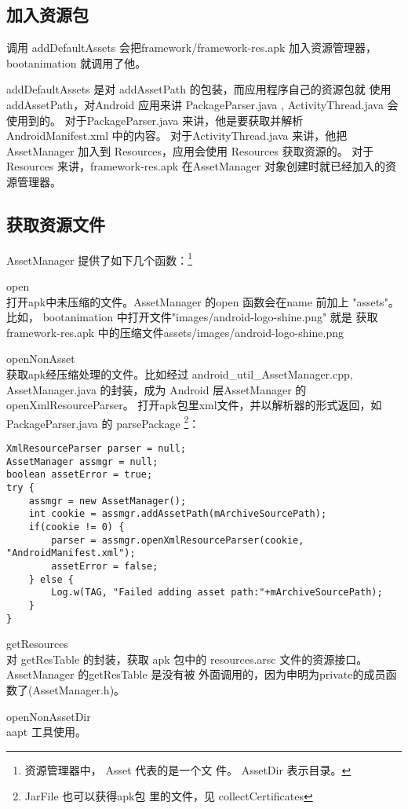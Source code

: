 \documentclass[a4paper,11pt]{article}
\begin{document}
\subsection{加入资源包}
调用 addDefaultAssets 会把framework/framework-res.apk 加入资源管理器，
bootanimation 就调用了他。

addDefaultAssets 是对 addAssetPath 的包装，而应用程序自己的资源包就 使用
addAssetPath，对Android 应用来讲 PackageParser.java , ActivityThread.java
会使用到的。
对于PackageParser.java 来讲，他是要获取并解析 AndroidManifest.xml 中的内容。
对于ActivityThread.java 来讲，他把 AssetManager 加入到 Resources，应用会使用
Resources 获取资源的。 对于 Resources 来讲，framework-res.apk 在AssetManager
对象创建时就已经加入的资源管理器。

\subsection{获取资源文件}
AssetManager 提供了如下几个函数：\footnote{资源管理器中， Asset 代表的是一个文
件。 AssetDir 表示目录。}
\begin{enumerate*}
    \item open\\ 打开apk中未压缩的文件。AssetManager 的open 函数会在name 前加上 "assets"。比如，
        bootanimation 中打开文件"images/android-logo-shine.png" 就是
        获取 framework-res.apk 中的压缩文件assets/images/android-logo-shine.png
    \item openNonAsset \\ 获取apk经压缩处理的文件。比如经过 android_util_AssetManager.cpp,
        AssetManager.java 的封装，成为 Android 层AssetManager 的
        openXmlResourceParser。 打开apk包里xml文件，并以解析器的形式返回，如
        PackageParser.java  的 parsePackage \footnote{JarFile 也可以获得apk包
        里的文件，见 collectCertificates}：
\begin{lstlisting}
XmlResourceParser parser = null;
AssetManager assmgr = null;
boolean assetError = true;
try {
    assmgr = new AssetManager();
    int cookie = assmgr.addAssetPath(mArchiveSourcePath);
    if(cookie != 0) {
        parser = assmgr.openXmlResourceParser(cookie, "AndroidManifest.xml");
        assetError = false;
    } else {
        Log.w(TAG, "Failed adding asset path:"+mArchiveSourcePath);
    }
}
\end{lstlisting}

    \item getResources \\ 对 getResTable 的封装，获取 apk 包中的
        resources.arsc 文件的资源接口。 AssetManager 的getResTable 是没有被
        外面调用的，因为申明为private的成员函数了(AssetManager.h)。

    \item openNonAssetDir \\ aapt 工具使用。
\end{enumerate*}
\end{document}
